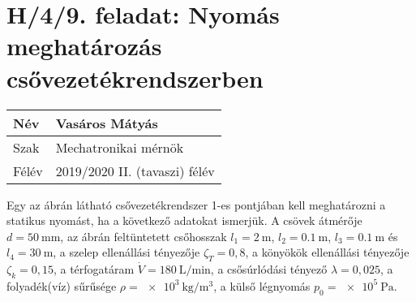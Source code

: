 \section*{H/4/9. feladat: Nyomás meghatározás csővezetékrendszerben}

\begin{tabular}{ | p{2cm} | p{14cm} | } 
	\hline
	Név & Vasáros Mátyás \\ 
	\hline
	Szak & Mechatronikai mérnök\\ 
	\hline
	Félév & 2019/2020 II. (tavaszi) félév \\ 
	\hline
\end{tabular}
\vspace{0.5cm}

\noindent Egy az ábrán látható csővezetékrendszer 1-es pontjában kell meghatározni a statikus nyomást, ha a következő adatokat ismerjük. A csövek átmérője $d = \SI{50}{\mm}$, az ábrán feltüntetett csőhosszak $l_{1} = \SI{2}{\m}$, $l_{2} = \SI{0,1}{\m}$, $l_{3} = \SI{0,1}{\m}$ és $l_{4} = \SI{30}{\m}$, a szelep ellenállási tényezője $\zeta_{T} ={0,8}$, a könyökök ellenállási tényezője $\zeta_{k} = {0,15}$, a térfogatáram $\dot{V}=\SI{180}{\liter\per\minute}$, a csősúrlódási tényező $\lambda={0,025}$, a folyadék(víz) sűrűsége $\rho=\SI{e3}{\kilogram\per\meter\cubed}$, a külső légnyomás $p_{0}=\SI{e5}{\pascal}$.


